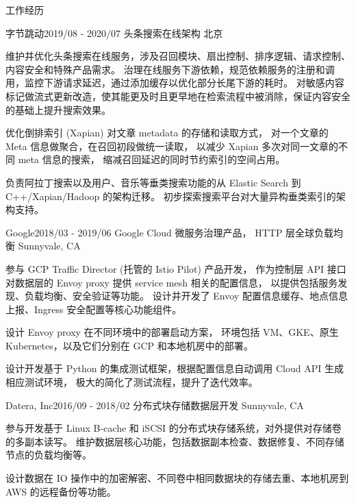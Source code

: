 \documentclass[
	a4paper,  %
	11pt,  %
]{resume}  %
\begin{document}
\begin{rSection}{工作经历}

	\begin{rSubsection}{字节跳动}{2019/08 - 2020/07}{ 头条搜索在线架构 }{北京}
		\item 维护并优化头条搜索在线服务，涉及召回模块、扇出控制、排序逻辑、请求控制、内容安全和特殊产品需求。
			  治理在线服务下游依赖，规范依赖服务的注册和调用，监控下游请求延迟，通过添加缓存以优化部分长尾下游的耗时。
			  对敏感内容标记做流式更新改造，使其能更及时且更早地在检索流程中被消除，保证内容安全的基础上提升搜索效果。
		\item 优化倒排索引 (Xapian) 对文章 metadata 的存储和读取方式，
			  对一个文章的 Meta 信息做聚合，在召回初段做统一读取，
			  以减少 Xapian 多次对同一文章的不同 meta 信息的搜索，
			  缩减召回延迟的同时节约索引的空间占用。
		\item 负责阿拉丁搜索以及用户、音乐等垂类搜索功能的从 Elastic Search 到 C++/Xapian/Hadoop 的架构迁移。
			  初步探索搜索平台对大量异构垂类索引的架构支持。
	\end{rSubsection}


	\begin{rSubsection}{Google}{2018/03 - 2019/06}{ Google Cloud 微服务治理产品， HTTP 层全球负载均衡 }{Sunnyvale, CA}
		\item 参与 GCP Traffic Director (托管的 Istio Pilot) 产品开发，
			  作为控制层 API 接口对数据层的 Envoy proxy 提供 service mesh 相关的配置信息，
			  以提供包括服务发现、负载均衡、安全验证等功能。
			  设计并开发了 Envoy 配置信息缓存、地点信息上报、Ingress 安全配置等核心功能组件。
		\item 设计 Envoy proxy 在不同环境中的部署启动方案，
			  环境包括 VM、GKE、原生 Kubernetes，以及它们分别在 GCP 和本地机房中的部署。
		\item 设计开发基于 Python 的集成测试框架，根据配置信息自动调用 Cloud API 生成相应测试环境，
			  极大的简化了测试流程，提升了迭代效率。
	\end{rSubsection}


	\begin{rSubsection}{Datera, Inc}{2016/09 - 2018/02}{ 分布式块存储数据层开发 }{Sunnyvale, CA}
		\item 参与开发基于 Linux B-cache 和 iSCSI 的分布式块存储系统，对外提供对存储卷的多副本读写。
			  维护数据层核心功能，包括数据副本检查、数据修复、不同存储节点的负载均衡等。
		\item 设计数据在 IO 操作中的加密解密、不同卷中相同数据块的存储去重、本地机房到 AWS 的远程备份等功能。
	\end{rSubsection}

\end{rSection}
\end{document}
